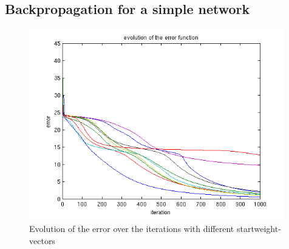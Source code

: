 \subsection{Backpropagation for a simple network}

\begin{figure}[hp!]
\begin{center}
 \includegraphics[width=0.99\textwidth]{./figures/1/error}
 \caption{Evolution of the error over the iterations with different startweight-vectors}
\label{fig:backprop_error}
\end{center}
\end{figure}



